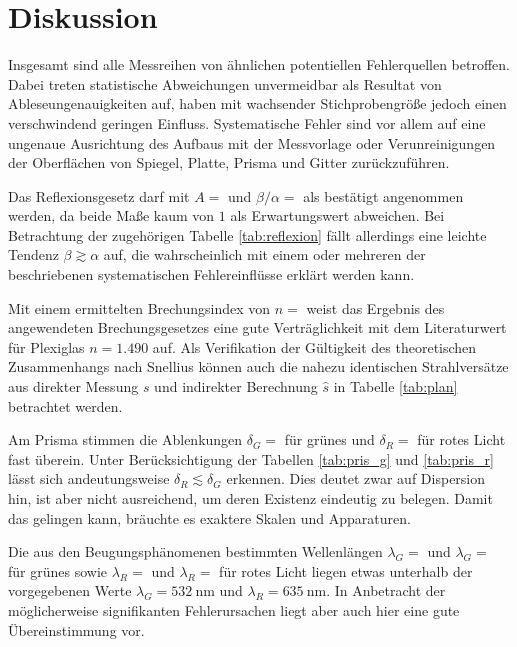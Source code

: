 \section{Diskussion}
\label{sec:diskussion}

Insgesamt sind alle Messreihen von ähnlichen potentiellen Fehlerquellen betroffen. Dabei treten statistische Abweichungen unvermeidbar als Resultat
von Ableseungenauigkeiten auf, haben mit wachsender Stichprobengröße jedoch einen verschwindend geringen Einfluss. Systematische Fehler sind vor
allem auf eine ungenaue Ausrichtung des Aufbaus mit der Messvorlage oder Verunreinigungen der Oberflächen von Spiegel, Platte, Prisma und Gitter
zurückzuführen.

Das Reflexionsgesetz darf mit $A = $ und $\beta / \alpha = $ als bestätigt angenommen
werden, da beide Maße kaum von $1$ als Erwartungswert abweichen. Bei Betrachtung der zugehörigen Tabelle \ref{tab:reflexion} fällt allerdings
eine leichte Tendenz $\beta \gtrsim \alpha$ auf, die wahrscheinlich mit einem oder mehreren der beschriebenen systematischen Fehlereinflüsse
erklärt werden kann.

Mit einem ermittelten Brechungsindex von $n = $ weist das Ergebnis des angewendeten Brechungsgesetzes eine gute
Verträglichkeit mit dem Literaturwert für Plexiglas $n = \num{1.490}$ auf. Als Verifikation der Gültigkeit des theoretischen Zusammenhangs
nach Snellius können auch die nahezu identischen Strahlversätze aus direkter Messung $s$ und indirekter Berechnung $\hat{s}$ in
Tabelle \ref{tab:plan} betrachtet werden. 

Am Prisma stimmen die Ablenkungen $\delta_G = $ für grünes und $\delta_R = $ für rotes Licht
fast überein. Unter Berücksichtigung der Tabellen \ref{tab:pris_g} und \ref{tab:pris_r} lässt sich andeutungsweise $\delta_R \lesssim \delta_G$
erkennen. Dies deutet zwar auf Dispersion hin, ist aber nicht ausreichend, um deren Existenz eindeutig zu belegen. Damit das gelingen kann,
bräuchte es exaktere Skalen und Apparaturen.

Die aus den Beugungsphänomenen bestimmten Wellenlängen $\lambda_G = $ und $\lambda_G = $
für grünes sowie $\lambda_R = $ und $\lambda_R = $ für rotes Licht liegen etwas unterhalb
der vorgegebenen Werte $\lambda_G = \qty{532}{\nano\meter}$ und $\lambda_R = \qty{635}{\nano\meter}$. In Anbetracht der möglicherweise
signifikanten Fehlerursachen liegt aber auch hier eine gute Übereinstimmung vor.
\newpage
